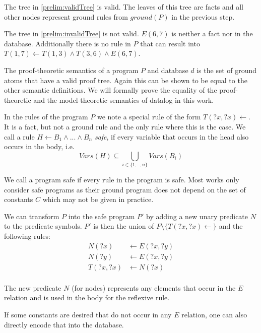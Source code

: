 \begin{contexample}
    The tree in \cref{prelim:validTree} is valid. The leaves of this tree are facts and all other nodes represent ground rules from $ground(P)$ in the previous step.

    The tree in \cref{prelim:invalidTree} is not valid. $E(6,7)$ is neither a fact nor in the database. Additionally there is no rule in $P$ that can result into $T(1,7) \leftarrow T(1,3) \land T(3,6) \land E(6,7)$.
\end{contexample}

The proof-theoretic semantics of a program $P$ and database $d$ is the set of ground atoms that have a valid proof tree. Again this can be shown to be equal to the other semantic definitions. We will formally prove the equality of the proof-theoretic and the model-theoretic semantics of datalog in this work.

In the rules of the program $P$ we note a special rule of the form $T(?x, ?x) \leftarrow$. It is a fact, but not a ground rule and the only rule where this is the case. 
We call a rule $H \leftarrow B_1 \land ... \land B_n$ \textit{safe}, if every variable that occurs in the head also occurs in the body, i.e. \[Vars(H) \subseteq \bigcup_{i \in \{1,..,n\} } Vars(B_i) \]

We call a program safe if every rule in the program is safe. Most works only consider safe programs as their ground program does not depend on the set of constants $C$ which may not be given in practice.

\begin{contexample}
    We can transform $P$ into the safe program $P'$ by adding a new unary predicate $N$ to the predicate symbols. $P'$ is then the union of $P \setminus \{T(?x, ?x) \leftarrow \}$ and the following rules:
    \begin{equation}
        \begin{split}
            N(?x) &\leftarrow E(?x, ?y) \\
            N(?y) &\leftarrow E(?x, ?y) \\
            T(?x,?x) &\leftarrow N(?x) \\
        \end{split}
    \end{equation}

    The new predicate $N$ (for nodes) represents any elements that occur in the $E$ relation and is used in the body for the reflexive rule.

    If some constants are desired that do not occur in any $E$ relation, one can also directly encode that into the database.
\end{contexample}

